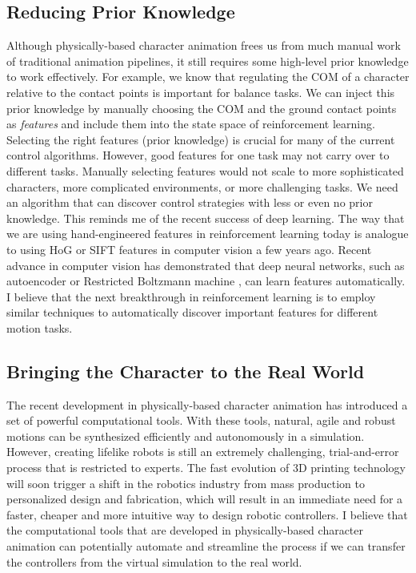 \subsection{Reducing Prior Knowledge}

Although physically-based character animation frees us from much manual work of traditional animation pipelines, it still requires some high-level prior knowledge to work effectively. For example, we know that regulating the COM of a character relative to the contact points is important for balance tasks. We can inject this prior knowledge by manually choosing the COM and the ground contact points as \emph{features} and include them into the state space of reinforcement learning. Selecting the right features (prior knowledge) is crucial for many of the current control algorithms. However, good features for one task may not carry over to different tasks. Manually selecting features would not scale to more sophisticated characters, more complicated environments, or more challenging tasks. We need an algorithm that can discover control strategies with less or even no prior knowledge. This reminds me of the recent success of deep learning. The way that we are using hand-engineered features in reinforcement learning today is analogue to using HoG or SIFT features in computer vision a few years ago. Recent advance in computer vision has demonstrated that deep neural networks, such as autoencoder \cite{Vincent:2008} or Restricted Boltzmann machine \cite{Hinton:2012}, can learn features automatically. I believe that the next breakthrough in reinforcement learning is to employ similar techniques to automatically discover important features for different motion tasks.

\subsection{Bringing the Character to the Real World}

The recent development in physically-based character animation has introduced a set of powerful computational tools. With these tools, natural, agile and robust motions can be synthesized efficiently and autonomously in a simulation. However, creating lifelike robots is still an extremely challenging, trial-and-error process that is restricted to experts. The fast evolution of 3D printing technology will soon trigger a shift in the robotics industry from mass production to personalized design and fabrication, which will result in an immediate need for a faster, cheaper and more intuitive way to design robotic controllers. I believe that the computational tools that are developed in physically-based character animation can potentially automate and streamline the process if we can transfer the controllers from the virtual simulation to the real world. 

